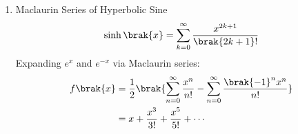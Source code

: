 \begin{enumerate}[label=\thesubsection.\arabic*, ref=\thesubsection.\theenumi]
\begin{enumerate}
		\item For the system $\vec{A}\vec{x} = \vec{b}$:
		The number of solutions depends entirely on the remaining unknown eigenvalues of $\vec{A}$. If all other eigenvalues are non-zero ($\mydet{\vec{A}} \neq 0$), the system has a unique solution. If $0$ happens to also be an eigenvalue of $\vec{A}$, the matrix is singular, resulting in either no solution or infinitely many solutions
	\end{enumerate}
	\item Maclaurin Series of Hyperbolic Sine
	\begin{align}
		\sinh\brak{x} = \sum_{k=0}^{\infty} \frac{x^{2k+1}}{\brak{2k+1}!} \label{eq:DA2025-maclaurin}
	\end{align}
	\solution
	Expanding $e^x$ and $e^{-x}$ via Maclaurin series:
	\begin{align}
		f\brak{x} &= \frac{1}{2}\brak{\sum_{n=0}^{\infty} \frac{x^n}{n!} - \sum_{n=0}^{\infty} \frac{\brak{-1}^n x^n}{n!}}
		\\
		&= x + \frac{x^3}{3!} + \frac{x^5}{5!} + \cdots
	\end{align}
	

\end{enumerate}

